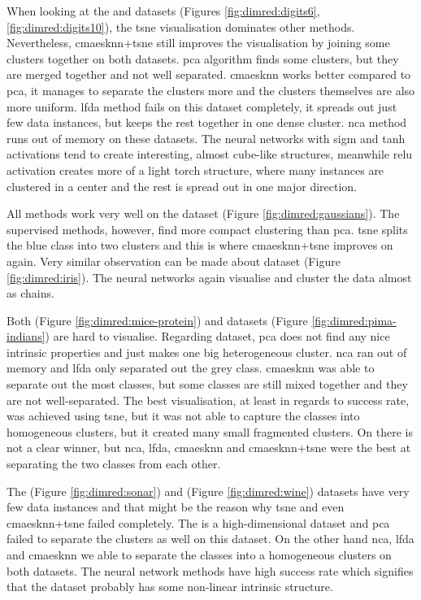 \documentclass[12pt,a4paper]{report}
\begin{document}
When looking at the  and  datasets (Figures \ref{fig:dimred:digits6}, \ref{fig:dimred:digits10}), the \ac{tsne} visualisation dominates other methods. Nevertheless, \ac{cmaesknn}+\ac{tsne} still improves the visualisation by joining some clusters together on both datasets. \ac{pca} algorithm finds some clusters, but they are merged together and not well separated. \ac{cmaesknn} works better compared to \ac{pca}, it manages to separate the clusters more and the clusters themselves are also more uniform. \ac{lfda} method fails on this dataset completely, it spreads out just few data instances, but keeps the rest together in one dense cluster. \ac{nca} method runs out of memory on these datasets. The neural networks with \ac{sigm} and \ac{tanh} activations tend to create interesting, almost cube-like structures, meanwhile \ac{relu} activation creates more of a light torch structure, where many instances are clustered in a center and the rest is spread out in one major direction.

All methods work very well on the  dataset (Figure \ref{fig:dimred:gaussians}). The supervised methods, however, find more compact clustering than \ac{pca}. \ac{tsne} splits the blue class into two clusters and this is where \ac{cmaesknn}+\ac{tsne} improves on again. Very similar observation can be made about  dataset (Figure \ref{fig:dimred:iris}). The neural networks again visualise and cluster the data almost as chains.

Both  (Figure \ref{fig:dimred:mice-protein}) and  datasets (Figure \ref{fig:dimred:pima-indians}) are hard to visualise. Regarding  dataset, \ac{pca} does not find any nice intrinsic properties and just makes one big heterogeneous cluster. \ac{nca} ran out of memory and \ac{lfda} only separated out the grey class. \ac{cmaesknn} was able to separate out the most classes, but some classes are still mixed together and they are not well-separated. The best visualisation, at least in regards to success rate, was achieved using \ac{tsne}, but it was not able to capture the classes into homogeneous clusters, but it created many small fragmented clusters. On  there is not a clear winner, but \ac{nca}, \ac{lfda}, \ac{cmaesknn} and \ac{cmaesknn}+\ac{tsne} were the best at separating the two classes from each other.

The  (Figure \ref{fig:dimred:sonar}) and  (Figure \ref{fig:dimred:wine}) datasets have very few data instances and that might be the reason why \ac{tsne} and even \ac{cmaesknn}+\ac{tsne} failed completely. The  is a high-dimensional dataset and \ac{pca} failed to separate the clusters as well on this dataset. On the other hand \ac{nca}, \ac{lfda} and \ac{cmaesknn} we able to separate the classes into a homogeneous clusters on both datasets. The neural network methods have high success rate which signifies that the dataset probably has some non-linear intrinsic structure.
\end{document}

